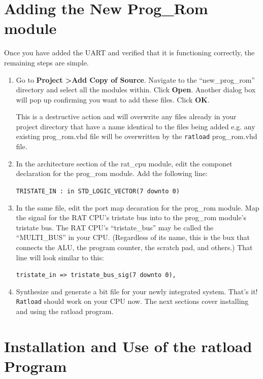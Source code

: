 \documentclass[notitlepage]{article}
\newcommand{\warningsign}{\fontencoding{U}\fontfamily{futs}\Large\selectfont\char 66\relax}
\begin{document}
\section{Adding the New Prog\_Rom module}
Once you have added the UART and verified that it is functioning correctly, the remaining steps are simple.
\begin{enumerate}
\item Go to \textbf{Project \textgreater Add Copy of Source}. Navigate to the ``new\_prog\_rom'' directory and select all the modules within. Click \textbf{Open}. Another dialog box will pop up confirming you want to add these files. Click \textbf{OK}.

\begin{infobox}
  {\warningsign} This is a destructive action and will overwrite any files already in your project directory that have a name identical to the files being added e.g. any existing prog\_rom.vhd file will be overwritten by the \texttt{ratload} prog\_rom.vhd file.
\end{infobox}

\item In the architecture section of the rat\_cpu module, edit the componet declaration for the prog\_rom module. Add the following line:\\
  \centerline{\texttt{TRISTATE\_IN : in STD\_LOGIC\_VECTOR(7 downto 0)}}

\item In the same file, edit the port map decaration for the prog\_rom module. Map the signal for the RAT CPU's tristate bus into to the prog\_rom module's tristate bus. The RAT CPU's ``tristate\_bus'' may be called the ``MULTI\_BUS'' in your CPU. (Regardless of its name, this is the bux that connects the ALU, the program counter, the scratch pad, and others.) That line will look similar to this:\\
  \centerline{\texttt{tristate\_in =\textgreater ~tristate\_bus\_sig(7 downto 0),}}

\item Synthesize and generate a bit file for your newly integrated system. That's it! \texttt{Ratload} should work on your CPU now. The next sections cover installing and using the ratload program.
\end{enumerate}

\section{Installation and Use of the ratload Program}
\end{document}
